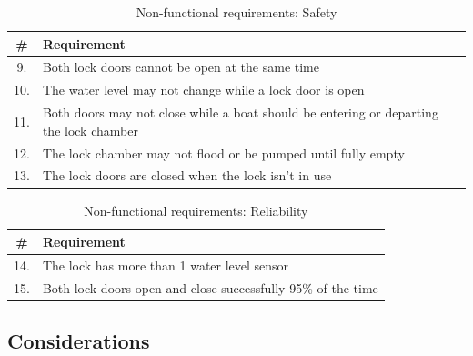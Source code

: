 \documentclass{article}
\begin{document}
        
        \begin{table}[h]
            \centering
            \begin{tabular}{|c|p{10cm}|}
                \hline
                \textbf{\#} & \textbf{Requirement} \\
                \hline
                9. & Both lock doors cannot be open at the same time \\ 
                \hline
                10. & The water level may not change while a lock door is open \\
                \hline
                11. & Both doors may not close while a boat should be entering or departing the lock chamber \\
                \hline
                12. & The lock chamber may not flood or be pumped until fully empty \\
                \hline
                13. & The lock doors are closed when the lock isn't in use \\
                \hline
            \end{tabular}
            \caption{Non-functional requirements: Safety}
            \label{tab:safety_req}
        \end{table}
        
        \begin{table}[h]
            \centering
            \begin{tabular}{|c|p{10cm}|}
                \hline
                \textbf{\#} & \textbf{Requirement} \\
                \hline
                14. & The lock has more than 1 water level sensor  \\ 
                \hline
                15. & Both lock doors open and close successfully 95\% of the time \\
                \hline
            \end{tabular}
            \caption{Non-functional requirements: Reliability}
            \label{tab:reliable_req}
        \end{table}
    
\newpage %
        
    \subsection{Considerations} %
        
\end{document}
